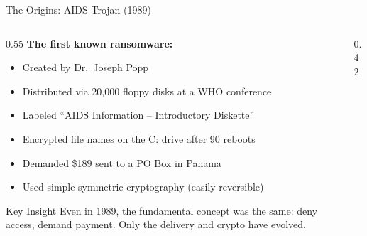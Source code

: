\documentclass[aspectratio=169]{beamer}
\begin{document}
\begin{frame}{The Origins: AIDS Trojan (1989)}
  \begin{columns}[T]
    \begin{column}{0.55\textwidth}
      \textbf{The first known ransomware:}
      \begin{itemize}
        \item Created by Dr.\ Joseph Popp
        \item Distributed via 20,000 floppy disks at a WHO conference
        \item Labeled ``AIDS Information -- Introductory Diskette''
        \item Encrypted file names on the C: drive after 90 reboots
        \item Demanded \$189 sent to a PO Box in Panama
        \item Used simple symmetric cryptography (easily reversible)
      \end{itemize}

      \vspace{0.5em}
      \begin{infobox}{Key Insight}
        Even in 1989, the fundamental concept was the same: deny access, demand payment. Only the delivery and crypto have evolved.
      \end{infobox}
    \end{column}
    \begin{column}{0.42\textwidth}
      \centering
    \end{column}
  \end{columns}
\end{frame}
\end{document}
